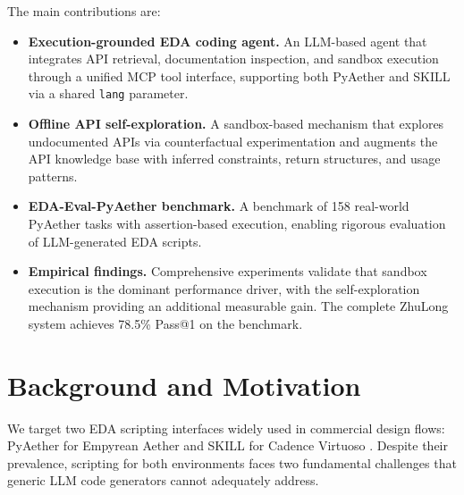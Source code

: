 \documentclass[anonymous, sigconf]{acmart}
\begin{document}
The main contributions are:
\begin{itemize}
    \item \textbf{Execution-grounded EDA coding agent.} An LLM-based agent that integrates API retrieval, documentation inspection, and sandbox execution through a unified MCP tool interface, supporting both PyAether and SKILL via a shared \texttt{lang} parameter.
    \item \textbf{Offline API self-exploration.} A sandbox-based mechanism that explores undocumented APIs via counterfactual experimentation and augments the API knowledge base with inferred constraints, return structures, and usage patterns.
    \item \textbf{EDA-Eval-PyAether benchmark.} A benchmark of 158 real-world PyAether tasks with assertion-based execution, enabling rigorous evaluation of LLM-generated EDA scripts.
    \item \textbf{Empirical findings.} Comprehensive experiments validate that sandbox execution is the dominant performance driver, with the self-exploration mechanism providing an additional measurable gain. The complete ZhuLong system achieves 78.5\% Pass@1 on the benchmark.
\end{itemize}

\section{Background and Motivation}
\label{sec:background}

We target two EDA scripting interfaces widely used in commercial design flows: PyAether for Empyrean Aether \cite{empyrean_pyaether} and SKILL for Cadence Virtuoso \cite{cadence2024virtuoso}. Despite their prevalence, scripting for both environments faces two fundamental challenges that generic LLM code generators cannot adequately address.
\end{document}
